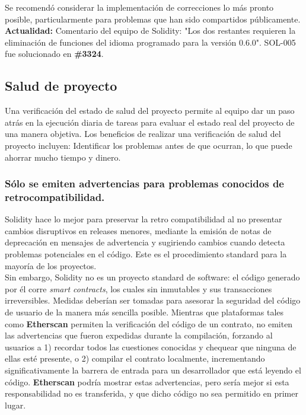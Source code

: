 Se recomendó considerar la implementación de correcciones lo más pronto posible, particularmente para problemas que han sido compartidos públicamente.\\

\textbf{Actualidad:} Comentario del equipo de Solidity: "Los dos restantes requieren la eliminación de funciones del idioma programado para la versión 0.6.0". SOL-005 fue solucionado en \textbf{\#3324}.\\

\subsection{Salud de proyecto}
Una verificación del estado de salud del proyecto permite al equipo dar un paso atrás en la ejecución diaria de tareas para evaluar el estado real del proyecto de una manera objetiva. Los beneficios de realizar una verificación de salud del proyecto incluyen: Identificar los problemas antes de que ocurran, lo que puede ahorrar mucho tiempo y dinero.


\subsubsection{Sólo se emiten advertencias para problemas conocidos de retrocompatibilidad.}
Solidity hace lo mejor para preservar la retro compatibilidad al no presentar cambios disruptivos en releases menores, mediante la emisión de notas de deprecación en mensajes de advertencia y sugiriendo cambios cuando detecta problemas potenciales en el código. Este es el procedimiento standard para la mayoría de los proyectos.\\

Sin embargo, Solidity no es un proyecto standard de software: el código generado por él corre \textit{smart contracts}, los cuales sin inmutables y sus transacciones irreversibles. Medidas deberían ser tomadas para asesorar la seguridad del código de usuario de la manera más sencilla posible. Mientras que plataformas tales como \textbf{Etherscan} permiten la verificación del código de un contrato, no emiten las advertencias que fueron expedidas durante la compilación, forzando al usuarios a 1) recordar todos las cuestiones conocidas y chequear que ninguna de ellas esté presente, o 2) compilar el contrato localmente, incrementando significativamente la barrera de entrada para un desarrollador que está leyendo el código. \textbf{Etherscan} podría mostrar estas advertencias, pero sería mejor si esta responsabilidad no es transferida, y que dicho código no sea permitido en primer lugar.\\

